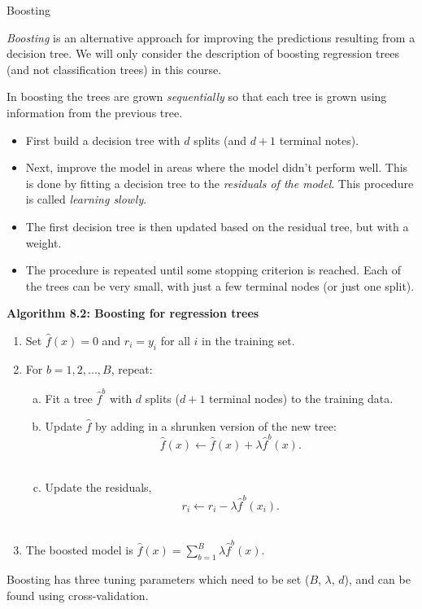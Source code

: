 \documentclass[10pt,ignorenonframetext,]{beamer}
\providecommand{\tightlist}{%
  \setlength{\itemsep}{0pt}\setlength{\parskip}{0pt}}
\begin{document}
\begin{frame}{Boosting}
\protect\hypertarget{boosting}{}

\emph{Boosting} is an alternative approach for improving the predictions
resulting from a decision tree. We will only consider the description of
boosting regression trees (and not classification trees) in this course.

In boosting the trees are grown \emph{sequentially} so that each tree is
grown using information from the previous tree.

\begin{itemize}
\tightlist
\item
  First build a decision tree with \(d\) splits (and \(d+1\) terminal
  notes).
\item
  Next, improve the model in areas where the model didn't perform well.
  This is done by fitting a decision tree to the \emph{residuals of the
  model}. This procedure is called \emph{learning slowly}.
\item
  The first decision tree is then updated based on the residual tree,
  but with a weight.
\item
  The procedure is repeated until some stopping criterion is reached.
  Each of the trees can be very small, with just a few terminal nodes
  (or just one split).
\end{itemize}

\end{frame}

\begin{frame}

\textbf{Algorithm 8.2: Boosting for regression trees}

\begin{enumerate}
\tightlist
\item
  Set \(\hat{f}(x) = 0\) and \(r_i = y_i\) for all \(i\) in the training
  set.
\item
  For \(b=1,2,...,B\), repeat:

  \begin{enumerate}
  [a)]
  \tightlist
  \item
    Fit a tree \(\hat{f}^b\) with \(d\) splits (\(d+1\) terminal nodes)
    to the training data.\\
  \item
    Update \(\hat{f}\) by adding in a shrunken version of the new tree:
    \[\hat{f}(x) \leftarrow \hat{f}(x)+\lambda \hat{f}^b(x).\]\\
  \item
    Update the residuals,
    \[r_i \leftarrow r_i - \lambda \hat{f}^b(x_i).\]\\
  \end{enumerate}
\item
  The boosted model is
  \(\hat{f}(x) = \sum_{b=1}^B \lambda \hat{f}^b(x).\)
\end{enumerate}

Boosting has three tuning parameters which need to be set (\(B\),
\(\lambda\), \(d\)), and can be found using cross-validation.

\end{frame}
\end{document}

